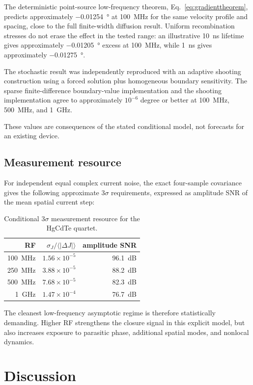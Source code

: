 \documentclass[11pt]{article}
\begin{document}
The deterministic point-source low-frequency theorem, Eq.~\eqref{eq:gradienttheorem}, predicts approximately \SI{-0.01254}{\degree} at \SI{100}{MHz} for the same velocity profile and spacing, close to the full finite-width diffusion result. Uniform recombination stresses do not erase the effect in the tested range: an illustrative \SI{10}{ns} lifetime gives approximately \SI{-0.01205}{\degree} excess at \SI{100}{MHz}, while \SI{1}{ns} gives approximately \SI{-0.01275}{\degree}.

The stochastic result was independently reproduced with an adaptive shooting construction using a forced solution plus homogeneous boundary sensitivity. The sparse finite-difference boundary-value implementation and the shooting implementation agree to approximately $10^{-6}$ degree or better at \SI{100}{MHz}, \SI{500}{MHz}, and \SI{1}{GHz}.

These values are consequences of the stated conditional model, not forecasts for an existing device.

\subsection{Measurement resource}

For independent equal complex current noise, the exact four-sample covariance gives the following approximate $3\sigma$ requirements, expressed as amplitude SNR of the mean spatial current step:
\begin{table}[h]
\centering
\caption{Conditional $3\sigma$ measurement resource for the HgCdTe quartet.}
\begin{tabular}{rrr}
\toprule
RF & $\sigma_J/\langle|\Delta J|\rangle$ & amplitude SNR \\
\midrule
\SI{100}{MHz} & $1.56\times10^{-5}$ & \SI{96.1}{dB} \\
\SI{250}{MHz} & $3.88\times10^{-5}$ & \SI{88.2}{dB} \\
\SI{500}{MHz} & $7.68\times10^{-5}$ & \SI{82.3}{dB} \\
\SI{1}{GHz} & $1.47\times10^{-4}$ & \SI{76.7}{dB} \\
\bottomrule
\end{tabular}
\end{table}
The cleanest low-frequency asymptotic regime is therefore statistically demanding. Higher RF strengthens the closure signal in this explicit model, but also increases exposure to parasitic phase, additional spatial modes, and nonlocal dynamics.

\section{Discussion}
\end{document}
